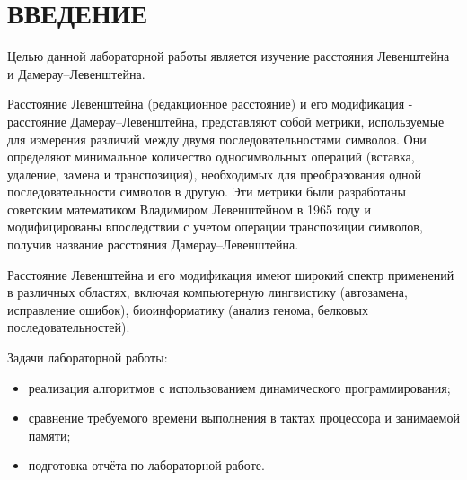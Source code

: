 \section*{ВВЕДЕНИЕ}

Целью данной лабораторной работы является изучение расстояния Левенштейна и Дамерау--Левенштейна.

Расстояние Левенштейна (редакционное расстояние) и его модификация - расстояние Дамерау--Левенштейна, представляют собой метрики, используемые для измерения различий между двумя последовательностями символов.
Они определяют минимальное количество односимвольных операций (вставка, удаление, замена и транспозиция), необходимых для преобразования одной последовательности символов в другую.
Эти метрики были разработаны советским математиком Владимиром Левенштейном в 1965 году и модифицированы впоследствии с учетом операции транспозиции символов, получив название расстояния Дамерау--Левенштейна.

Расстояние Левенштейна и его модификация имеют широкий спектр применений в различных областях, включая компьютерную лингвистику (автозамена, исправление ошибок), биоинформатику (анализ генома, белковых последовательностей).

Задачи лабораторной работы:
\begin{itemize}
    \item реализация алгоритмов с использованием динамического программирования;
    \item сравнение требуемого времени выполнения в тактах процессора и занимаемой памяти;
    \item подготовка отчёта по лабораторной работе.
\end{itemize}

